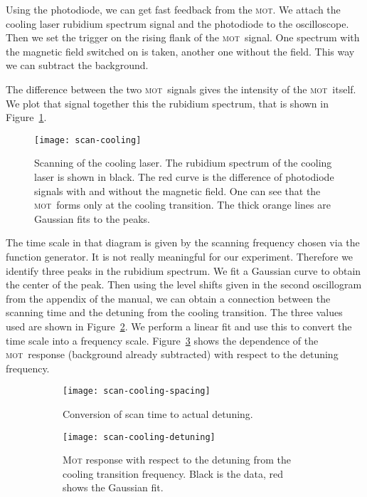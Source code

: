 \documentclass[11pt, english, fleqn, DIV=15, headinclude, BCOR=2cm]{scrreprt}
\newcommand\mot{\textsc{mot}}
\begin{document}
Using the photodiode, we can get fast feedback from the \mot. We attach the
cooling laser rubidium spectrum signal and the photodiode to the oscilloscope.
Then we set the trigger on the rising flank of the \mot\ signal. One spectrum
with the magnetic field switched on is taken, another one without the field.
This way we can subtract the background.

The difference between the two \mot\ signals gives the intensity of the \mot\
itself. We plot that signal together this the rubidium spectrum, that is shown
in Figure~\ref{fig:scan-cooling}.


\begin{figure}
    \centering
    \texttt{[image: scan-cooling]}
    \caption{%
        Scanning of the cooling laser. The rubidium spectrum of the cooling
        laser is shown in black. The red curve is the difference of photodiode
        signals with and without the magnetic field. One can see that the \mot\
        forms only at the cooling transition. The thick orange lines are
        Gaussian fits to the peaks.
    }
    \label{fig:scan-cooling}
\end{figure}

The time scale in that diagram is given by the scanning frequency chosen via
the function generator. It is not really meaningful for our experiment.
Therefore we identify three peaks in the rubidium spectrum. We fit a Gaussian
curve to obtain the center of the peak. Then using the level shifts given in
the second oscillogram from the appendix of the manual, we can obtain a
connection between the scanning time and the detuning from the cooling
transition. The three values used are shown in
Figure~\ref{fig:scan-cooling-spacing}. We perform a linear fit and use this to
convert the time scale into a frequency scale.
Figure~\ref{fig:scan-cooling-detuning} shows the dependence of the \mot\
response (background already subtracted) with respect to the detuning
frequency.

\begin{figure}
    \centering
    \begin{subfigure}[t]{0.48\linewidth}
        \centering
        \texttt{[image: scan-cooling-spacing]}
        \caption{%
            Conversion of scan time to actual detuning.
            }
        \label{fig:scan-cooling-spacing}
    \end{subfigure}
    \hfill
    \begin{subfigure}[t]{0.48\linewidth}
        \centering
        \texttt{[image: scan-cooling-detuning]}
        \caption{%
            \textsc{Mot} response with respect to the detuning from the cooling
            transition frequency. Black is the data, red shows the Gaussian
            fit.
            }
        \label{fig:scan-cooling-detuning}
    \end{subfigure}
    \caption{%
        }
    \label{fig:}
\end{figure}
\end{document}
